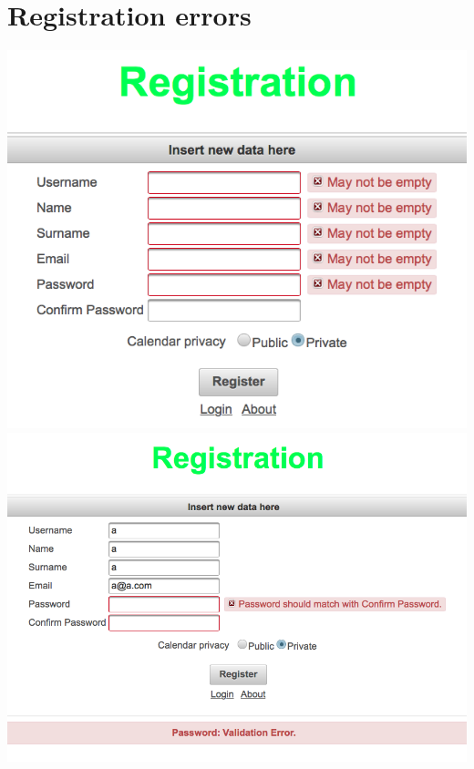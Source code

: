 \documentclass[10pt,a4paper,titlepage]{article}
\begin{document}
\section{Registration errors}
\begin{center}
\includegraphics[width=0.7\linewidth]{./images/32_error_registration_1}
\includegraphics[width=0.7\linewidth]{./images/33_error_registration_2}
\end{center}
\end{document}
